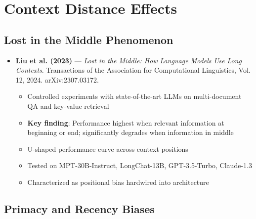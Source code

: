 \documentclass[11pt,letterpaper]{article}
\begin{document}
\section{Context Distance Effects}

\subsection{Lost in the Middle Phenomenon}

\begin{itemize}[leftmargin=*]
\item \textbf{Liu et al. (2023)} --- \textit{Lost in the Middle: How Language Models Use Long Contexts}. Transactions of the Association for Computational Linguistics, Vol. 12, 2024. arXiv:2307.03172.
  \begin{itemize}
  \item Controlled experiments with state-of-the-art LLMs on multi-document QA and key-value retrieval
  \item \textbf{Key finding}: Performance highest when relevant information at beginning or end; significantly degrades when information in middle
  \item U-shaped performance curve across context positions
  \item Tested on MPT-30B-Instruct, LongChat-13B, GPT-3.5-Turbo, Claude-1.3
  \item Characterized as positional bias hardwired into architecture
  \end{itemize}
\end{itemize}

\subsection{Primacy and Recency Biases}
\end{document}

